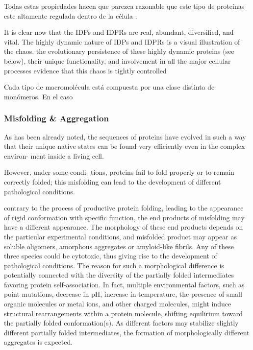 Todas estas propiedades hacen que parezca razonable que este tipo de proteínas este altamente regulada dentro de la célula \cite{gsponer2008tight}.

It is clear now that the IDPs and IDPRs are real, abundant, diversified, and vital. The highly dynamic nature of IDPs and IDPRs is a visual illustration of the chaos.
the evolutionary persistence of these highly dynamic proteins (see below), their unique functionality, and involvement in all the
major cellular processes evidence that this chaos is tightly controlled



Cada tipo de macromolécula está compuesta por una clase distinta de monómeros. En el caso

\subsubsection{Misfolding \& Aggregation}

As has been already noted, the sequences of proteins have
evolved in such a way that their unique native states can
be found very efficiently even in the complex environ-
ment inside a living cell.

However, under some condi-
tions, proteins fail to fold properly or to remain correctly
folded; this misfolding can lead to the development of
different pathological conditions.

contrary to the process of productive protein folding, leading to the appearance of rigid conformation with specific function, the end products of misfolding may have a different appearance. 
The morphology of these end products depends on the particular experimental conditions, and misfolded product may appear as soluble oligomers, amorphous aggregates or amyloid-like fibrils. 
Any of these three species could be cytotoxic, thus giving rise to the development of pathological conditions. 
The reason for such a morphological difference is potentially connected with the diversity of the partially folded intermediates favoring protein self-association. 
In fact, multiple environmental factors, such as point mutations, decrease in pH, increase in temperature, the presence of small organic molecules or metal ions, and other charged molecules, might induce structural rearrangements within a protein molecule, shifting equilirium toward the partially folded conformation(s). As different factors may stabilize slightly different partially folded intermediates, the formation of morphologically
different aggregates is expected.


